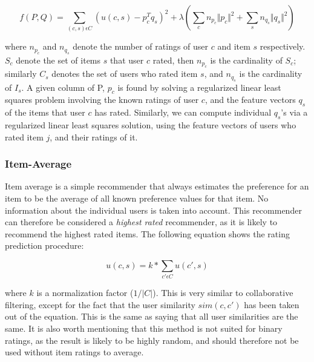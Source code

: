 \begin{equation}
f(P, Q) = \sum_{(c,s)\epsilon C} (u(c,s) - p^{T}_{c}q_{s})^{2} + \lambda (\sum_{c} n_{p_{c}} \Vert p_{c} \Vert ^{2} + \sum_{s} n_{q_{s}} \Vert q_{s} \Vert ^{2})
\label{WeightedLamba}
\end{equation}

where $n_{p_{c}}$ and $n_{q_{s}}$ denote the number of ratings of user $c$ and item $s$ respectively. $S_{c}$ denote the set of items $s$ that user $c$ rated, then $n_{p_{c}}$ is the cardinality of $S_{c}$; similarly $C_{s}$ denotes the set of users who rated item $s$, and $n_{q_{s}}$ is the cardinality of $I_{s}$. A given column of P, $p_{c}$ is found by solving a regularized linear least squares problem involving the known ratings of user $c$, and the feature vectors $q_{s}$ of the items that user $c$ has rated. Similarly, we can compute individual $q_{s}$'s via a regularized linear least squares solution, using the feature vectors of users who rated item $j$, and their ratings of it.


\subsubsection{Item-Average}

Item average is a simple recommender that always estimates the preference for an item to be the average of all known preference values for that item. No information about the individual users is taken into account. This recommender can therefore be considered a \emph{highest rated} recommender, as it is likely to recommend the highest rated items. The following equation shows the rating prediction procedure:

\begin{equation}
\label{equation:itemaverageratingprediction}
u(c,s) = k * \sum_{c' \epsilon C} u(c',s)
\end{equation}

where $k$ is a normalization factor ($1/|C|$). This is very similar to collaborative filtering, except for the fact that the user similarity $sim(c, c')$ has been taken out of the equation. This is the same as saying that all user similarities are the same. It is also worth mentioning that this method is not suited for binary ratings, as the result is likely to be highly random, and should therefore not be used without item ratings to average.


